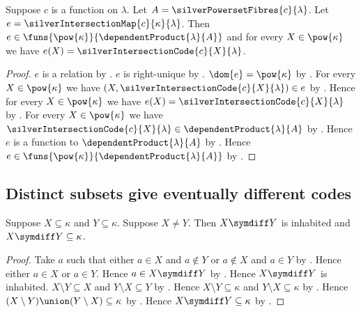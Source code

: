 \begin{proposition}\label{silver_intersection_map_function}
    Suppose $c$ is a function on $\lambda$.
    Let $A=\silverPowersetFibres{c}{\lambda}$.
    Let $e=\silverIntersectionMap{c}{\kappa}{\lambda}$.
    Then $e\in\funs{\pow{\kappa}}{\dependentProduct{\lambda}{A}}$ and
        for every $X\in\pow{\kappa}$ we have
            $e(X)=\silverIntersectionCode{c}{X}{\lambda}$.
\end{proposition}
\begin{proof}
    $e$ is a relation by .
    $e$ is right-unique
        by .
    $\dom{e}=\pow{\kappa}$
        by .
    For every $X\in\pow{\kappa}$ we have
        $(X,\silverIntersectionCode{c}{X}{\lambda})\in e$
        by .
    Hence for every $X\in\pow{\kappa}$ we have
        $e(X)=\silverIntersectionCode{c}{X}{\lambda}$
        by .
    For every $X\in\pow{\kappa}$ we have
        $\silverIntersectionCode{c}{X}{\lambda}
            \in\dependentProduct{\lambda}{A}$
        by .
    Hence $e$ is a function to $\dependentProduct{\lambda}{A}$
        by \auto.
    Hence $e\in\funs{\pow{\kappa}}{\dependentProduct{\lambda}{A}}$
        by .
\end{proof}

\subsection{Distinct subsets give eventually different codes}

\begin{proposition}\label{distinct_subsets_have_symmetric_difference}
    Suppose $X\subseteq\kappa$ and $Y\subseteq\kappa$.
    Suppose $X\neq Y$.
    Then $X\symdiff Y$ is inhabited and $X\symdiff Y\subseteq\kappa$.
\end{proposition}
\begin{proof}
    Take $a$ such that either $a\in X$ and $a\notin Y$
        or $a\notin X$ and $a\in Y$ by .
    Hence either $a\in X$ or $a\in Y$.
    Hence $a\in X\symdiff Y$ by .
    Hence $X\symdiff Y$ is inhabited.
    $X\setminus Y\subseteq X$ and $Y\setminus X\subseteq Y$
        by .
    Hence $X\setminus Y\subseteq\kappa$ and
        $Y\setminus X\subseteq\kappa$
        by .
    Hence $(X\setminus Y)\union(Y\setminus X)\subseteq\kappa$
        by .
    Hence $X\symdiff Y\subseteq\kappa$ by .
\end{proof}


